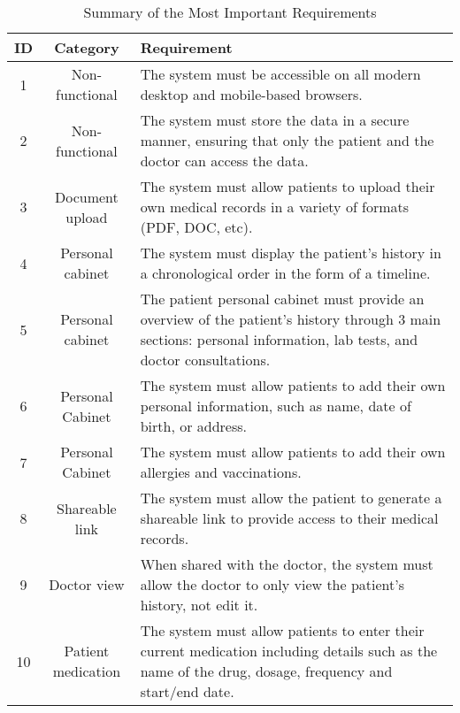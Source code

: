 \begin{table}[h!]
    \centering
    \begin{tabular}{|c|c|p{}|}
    \hline
    \textbf{ID} & \textbf{Category}                  & \textbf{Requirement}                                                                \\ \hline
    1   & Non-functional     & The system must be accessible on all modern desktop and mobile-based browsers.       \\ \hline
    2   & Non-functional     & The system must store the data in a secure manner, ensuring that only the patient and the doctor can access the data. \\ \hline
    3   & Document upload                 & The system must allow patients to upload their own medical records in a variety of formats (PDF, DOC, etc). \\ \hline
    4  & Personal cabinet        & The system must display the patient's history in a chronological order in the form of a timeline. \\ \hline
    5   & Personal cabinet        & The patient personal cabinet must provide an overview of the patient's history through 3 main sections: personal information, lab tests, and doctor consultations. \\ \hline
    6  & Personal Cabinet & The system must allow patients to add their own personal information, such as name, date of birth, or address. \\ \hline
    7  & Personal Cabinet & The system must allow patients to add their own allergies and vaccinations. \\ \hline
    8   & Shareable link          & The system must allow the patient to generate a shareable link to provide access to their medical records. \\ \hline
    9   & Doctor view & When shared with the doctor, the system must allow the doctor to only view the patient's history, not edit it. \\ \hline
    10   & Patient medication              & The system must allow patients to enter their current medication including details such as the name of the drug, dosage, frequency and start/end date. \\ \hline
    \end{tabular}
    \caption{Summary of the Most Important Requirements}
\end{table}
    
    
    
    